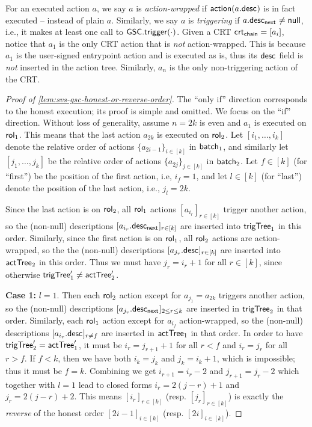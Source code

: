
For an executed action $a$, we say $a$ is \emph{action-wrapped} if $\mathsf{action}{}(a.\mathsf{desc}_{})$ is in fact executed -- instead of plain $a$. 
Similarly, we say $a$ is \emph{triggering} if $a.\mathsf{desc_{next}}_{} \neq \mathsf{null}$, i.e., it makes at least one call to $\mathsf{GSC}.\mathsf{trigger}(\cdot)$. Given a CRT $\mathsf{crt_{chain}} = [a_i]$, notice that $a_1$ is the only CRT action that is \emph{not} action-wrapped. This is because $a_1$ is the user-signed entrypoint action and is executed as is, thus its $\mathsf{desc}_{}$ field is \emph{not} inserted in the action tree. Similarly, $a_n$ is the only non-triggering action of the CRT.  






\begin{proof}[Proof of \cref{lem:svs-gsc-honest-or-reverse-order}]
    The ``only if'' direction corresponds to the honest execution; its proof is simple and omitted. We focus on the ``if'' direction. Without loss of generality, assume $n = 2k$ is even and $a_1$ is executed on $\mathsf{rol}_{1}$. This means that the last action $a_{2k}$ is executed on $\mathsf{rol}_{2}$. 
    Let $[i_1, \dots, i_k]$ denote the relative order of actions $\{a_{2i-1}\}_{i \in [k]}$ in $\mathsf{batch}_{1}$, and similarly let $[j_1, \dots, j_k]$ be the relative order of actions $\{a_{2j}\}_{j \in [k]}$ in $\mathsf{batch}_{2}$. Let $f \in [k]$ (for ``first'') be the position of the first action, i.e, $i_f = 1$, and let $l \in [k]$ (for ``last'') denote the position of the last action, i.e., $j_l = 2k$.

    Since the last action is on $\mathsf{rol}_{2}$, all $\mathsf{rol}_{1}$ actions $[a_{i_r}]_{r \in [k]}$ trigger another action, so the (non-null) descriptions $[a_{i_r}.\mathsf{desc_{next}}_{}]_{r \in [k]}$ are inserted into $\mathsf{trigTree}_1$ in this order. Similarly, since the first action is on $\mathsf{rol}_{1}$, all $\mathsf{rol}_{2}$ actions are action-wrapped, so the the (non-null) descriptions $[a_{j_r}.\mathsf{desc}_{}]_{r \in [k]}$ are inserted into $\mathsf{actTree}_2$ in this order. Thus we must have $j_r = i_r + 1$ for all $r \in [k]$, since otherwise $\mathsf{trigTree}_1' \neq \mathsf{actTree}_2'$. 
    
    \noindent\textbf{Case 1:} $l = 1$. Then each $\mathsf{rol}_{2}$ action except for $a_{j_1} = a_{2k}$ triggers another action, so the (non-null) descriptions $[a_{j_r}.\mathsf{desc_{next}}_{}]_{2 \leq r  \leq k}$ are inserted in $\mathsf{trigTree}_2$ in that order. Similarly, each $\mathsf{rol}_{1}$ action except for $a_{i_f}$ action-wrapped, so the (non-null) descriptions $[a_{i_r}.\mathsf{desc}_{}]_{r \neq f}$ are inserted in $\mathsf{actTree}_1$ in that order. In order to have $\mathsf{trigTree}_2' = \mathsf{actTree}_1'$, it must be $i_r = j_{r+1} + 1$ for all $r < f$ and $i_r = j_r$ for all $r > f$. If $f < k$, then we have both $i_{k} = j_{k}$ and $j_{k} = i_{k} + 1$, which is impossible; thus it must be $f = k$. Combining we get $i_{r+1} = i_r - 2$ and $j_{r+1} = j_r - 2$ which together with $l=1$ lead to closed forms $i_r = 2(j-r) + 1$ and $j_r = 2(j-r) + 2$. This means $[i_r]_{r \in [k]}$ (resp. $[j_r]_{r \in [k]}$) is exactly the \emph{reverse} of the honest order $[2i - 1]_{i \in [k]}$ (resp. $[2i]_{i \in [k]}$).
    

\end{proof}
